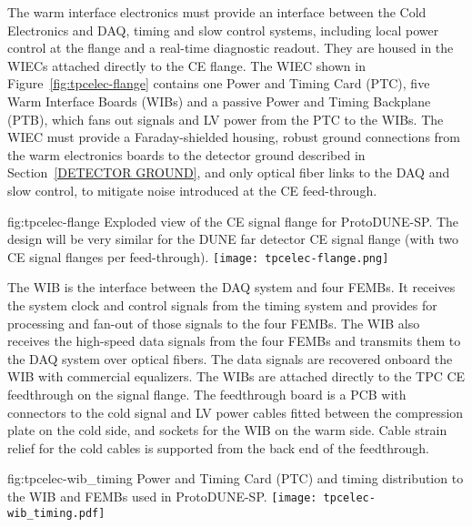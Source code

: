 The warm interface electronics must provide an interface between the Cold Electronics and DAQ, timing and slow control systems, including local power control at the flange and a real-time diagnostic readout. They are housed in the WIECs attached directly to the CE flange.  The WIEC shown in Figure~\ref{fig:tpcelec-flange} 
contains one
Power and Timing Card (PTC), five Warm Interface Boards (WIBs) and a passive
Power and Timing Backplane (PTB), which fans out signals and LV power from the PTC to the WIBs. The WIEC must provide a Faraday-shielded housing, robust ground connections from the warm electronics boards to the detector ground described in Section~\ref{DETECTOR GROUND}, and only optical fiber links to the DAQ and slow control, to mitigate noise introduced at the CE feed-through.

\begin{dunefigure}
{fig:tpcelec-flange}
{Exploded view of the CE signal flange for ProtoDUNE-SP.  The design will be very similar for the DUNE far detector CE signal flange (with two CE signal flanges per feed-through).}
\texttt{[image: tpcelec-flange.png]}
\end{dunefigure}

The WIB is the interface between the
DAQ system and four
FEMBs. It receives the system clock and control signals from the
timing system and provides for processing and fan-out of those signals to the four
FEMBs. The WIB also receives the high-speed data signals from the four 
FEMBs and transmits them to the DAQ system over optical
fibers. The data signals are recovered onboard the WIB with commercial equalizers.
The WIBs are attached directly to the TPC
CE feedthrough on the signal flange. The feedthrough
board is a PCB with connectors to the cold signal and LV power cables fitted
between the compression plate on the cold side, and sockets for
the WIB on the warm side. Cable strain relief for the cold cables is 
supported from the back end of the feedthrough.

\begin{dunefigure}
{fig:tpcelec-wib_timing}
{Power and Timing Card (PTC) and timing distribution to the WIB and FEMBs used in ProtoDUNE-SP.}
\texttt{[image: tpcelec-wib\_timing.pdf]}
\end{dunefigure}

